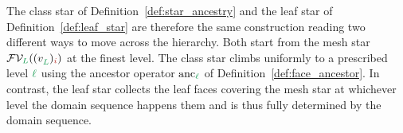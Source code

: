 \documentclass[a4paper, 12pt]{article}
\makeatletter
\newcommand{\lmin}{\l_{\min}}
\newcommand{\green}{\color{ForestGreen}}
\newcommand{\brickred}{\color{BrickRed}}
\newcommand{\V}{\mathcal{V}}
\newcommand{\F}{\mathcal{F}}
\newcommand{\vertex}[2]{\freeQ{v}{}{#1}{#2}}
\newcommand{\FVl}[1]{\F\V_{#1}}
\newcommand{\coarseIdxone}{{\brickred i}}
\renewcommand{\l}{{\green\ell}}
\renewcommand{\L}{{\green L}}
\newcommand{\lzero}{{\green 0}}
\newcommand{\freeQ}[4]{ ( {#1}^{#2}_{#3} )_{#4}}
\theoremstyle{definition}
\theoremstyle{plain}
\numberwithin{equation}{section}
\DeclareRobustCommand{\domseq}[1][]{\mathcal{D}\ifx\@empty#1\@empty\else_{#1}\fi}
\newcommand{\anc}[1]{\mathrm{anc}_{#1}}                     %
\makeatother
\begin{document}
The class star of Definition~\ref{def:star_ancestry} and the leaf star of Definition~\ref{def:leaf_star} are therefore the same construction reading two different ways to move across the hierarchy. Both start from the mesh star $\FVl{\L}(\vertex{\L}{\coarseIdxone})$ at the finest level. The class star climbs uniformly to a prescribed level $\l$ using the ancestor operator $\anc{\l}$ of Definition~\ref{def:face_ancestor}. In contrast, the leaf star collects the leaf faces covering the mesh star at whichever level the domain sequence happens them and is thus fully determined by the domain sequence.

%
%
\end{document}
